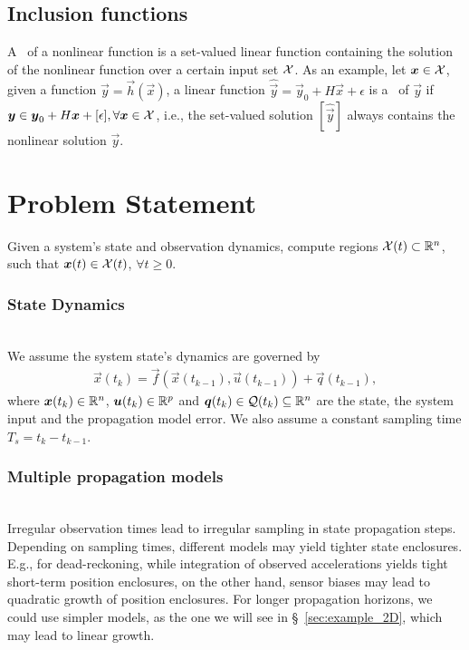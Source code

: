 \documentclass{ifacconf}
\begin{document}
\subsection{Inclusion functions}
\vspace{-0.2cm}
A \linearinclusion\ of a nonlinear function is a set-valued linear function containing the solution of the nonlinear function over a certain input set $\mathcal{X}$.
As an example, let ${\boldsymbol{x} \in \mathcal{X}}$, given a function
  $\vec{y} = \vec{h}(\vec{x})$,
a linear function
$\hat{\vec{y}} = \vec{y}_0 + H \vec{x} + \epsilon$
is a \linearinclusion\ of $\vec{y}$ if
$\boldsymbol{y} \in \boldsymbol{y}_0 + H \boldsymbol{x} + [\mathcal{\epsilon}], \forall \boldsymbol{x} \in \mathcal{X}$,
i.e., the set-valued solution $[\hat{\vec{y}}]$ always contains the nonlinear solution $\vec{y}$.

\section{Problem Statement}\label{sec:problemstatement}
\vspace{-0.2cm}
Given a system's state and observation dynamics, compute regions ${\mathcal{X}(t) \subset \mathbb{R}^n}$, such that $\boldsymbol{x}(t)\in\mathcal{X}(t)$, $\forall t\geq0$.

\subsubsection{State Dynamics}~\\
We assume the system state's dynamics are governed by
\begin{align}
  \vec{x}(t_{k}) = \vec{f}(\vec{x}(t_{k-1}),\vec{u}(t_{k-1})) + \vec{q}(t_{k-1}),
  \label{eq:setfilter_plant_static}
\end{align}
where ${\boldsymbol{x}(t_{k}) \in \mathbb{R}^n}$,
${\boldsymbol{u}(t_{k}) \in \mathbb{R}^p}$ and
${\boldsymbol{q}(t_{k}) \in \mathcal{Q}(t_{k}) \subseteq \mathbb{R}^n}$ are
the state, the system input and the propagation model error.
We also assume
a constant sampling time ${T_s = t_{k} - t_{k-1}}$.


\subsubsection{Multiple propagation models}~\\
Irregular observation times lead to irregular sampling in state propagation steps.
Depending on sampling times, different models may yield tighter state enclosures. E.g., for dead-reckoning,
while integration of observed accelerations yields tight short-term position enclosures, on the other hand, sensor biases may lead to quadratic growth of position enclosures.
For longer propagation horizons, we could use simpler models, as the one we will see in \S~\ref{sec:example_2D}, which may lead to linear growth.
\end{document}
